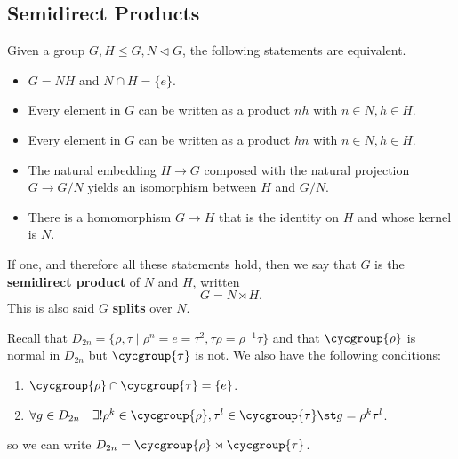 \subsection{Semidirect Products}
\begin{df}
\label{sdprod}
Given a group $G, H \leq G, N \lhd G$, the following statements are
equivalent.
\begin{itemize}
\item $G = NH$ and $N \cap H = \lbrace e \rbrace$.
\item Every element in $G$ can be written as a product $nh$ with $n \in
N, h \in H$.
\item Every element in $G$ can be written as a product $hn$ with $n \in
N, h \in H$.
\item The natural embedding $H \to G$ composed with the natural
projection $G \to G / N$ yields an isomorphism between $H$ and $G / N$.
\item There is a homomorphism $G \to H$ that is the identity on $H$ and
whose kernel is $N$.
\end{itemize}
If one, and therefore all these statements hold, then we say that $G$ is
the \textbf{semidirect product} of $N$ and $H$, written
\[ G = N \rtimes H. \]
This is also said $G$ \textbf{splits} over $N$.
\end{df}

\begin{ex}
Recall that $D_{2n} = \lbrace \rho, \tau \mid \rho^n = e = \tau^2, \tau
\rho = \rho^{-1} \tau \rbrace$ and that $\cycgroup{\rho}$ is normal in
$D_{2n}$ but $\cycgroup{\tau}$ is not. We also have the following
conditions:
\begin{enumerate}
\item $\cycgroup{\rho} \cap \cycgroup{\tau} = \lbrace e \rbrace$.
\item $\forall g \in D_{2n} \quad \exists! \rho^k \in \cycgroup{\rho},
\tau^l \in \cycgroup{\tau} \st g = \rho^k \tau^l$.
\end{enumerate}
so we can write $D_{2n} = \cycgroup{\rho} \rtimes \cycgroup{\tau}$.
\end{ex}

